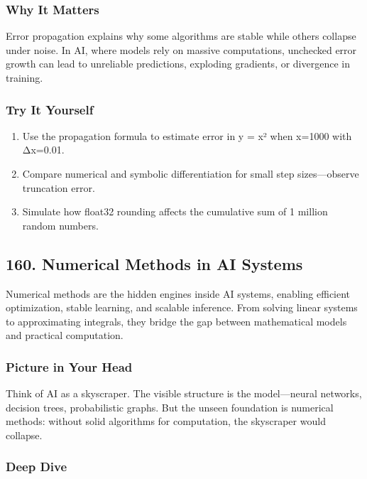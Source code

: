 \documentclass[
  letterpaper,
  DIV=11,
  numbers=noendperiod]{scrreprt}
\providecommand{\tightlist}{%
  \setlength{\itemsep}{0pt}\setlength{\parskip}{0pt}}
\begin{document}
\subsubsection{Why It Matters}\label{why-it-matters-56}

Error propagation explains why some algorithms are stable while others
collapse under noise. In AI, where models rely on massive computations,
unchecked error growth can lead to unreliable predictions, exploding
gradients, or divergence in training.

\subsubsection{Try It Yourself}\label{try-it-yourself-158}

\begin{enumerate}
\def\labelenumi{\arabic{enumi}.}
\tightlist
\item
  Use the propagation formula to estimate error in y = x² when x=1000
  with Δx=0.01.
\item
  Compare numerical and symbolic differentiation for small step
  sizes---observe truncation error.
\item
  Simulate how float32 rounding affects the cumulative sum of 1 million
  random numbers.
\end{enumerate}

\subsection{160. Numerical Methods in AI
Systems}\label{numerical-methods-in-ai-systems}

Numerical methods are the hidden engines inside AI systems, enabling
efficient optimization, stable learning, and scalable inference. From
solving linear systems to approximating integrals, they bridge the gap
between mathematical models and practical computation.

\subsubsection{Picture in Your Head}\label{picture-in-your-head-159}

Think of AI as a skyscraper. The visible structure is the model---neural
networks, decision trees, probabilistic graphs. But the unseen
foundation is numerical methods: without solid algorithms for
computation, the skyscraper would collapse.

\subsubsection{Deep Dive}\label{deep-dive-159}
\end{document}
